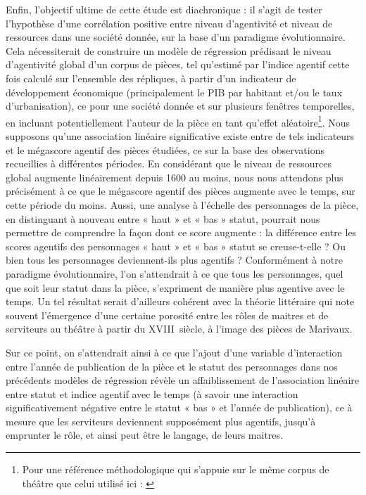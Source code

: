 Enfin, l’objectif ultime de cette étude est diachronique : il s’agit de tester l’hypothèse d’une corrélation positive entre niveau d’agentivité et niveau de ressources dans une société donnée, sur la base d’un paradigme évolutionnaire. Cela nécessiterait de construire un modèle de régression prédisant le niveau d’agentivité global d’un corpus de pièces, tel qu’estimé par l’indice agentif cette fois calculé sur l’ensemble des répliques, à partir d’un indicateur de développement économique (principalement le PIB par habitant et/ou le taux d'urbanisation), ce pour une société donnée et sur plusieurs fenêtres temporelles, en incluant potentiellement l’auteur de la pièce en tant qu’effet aléatoire\footnote{Pour une référence méthodologique qui s’appuie sur le même corpus de théâtre que celui utilisé ici : \cite{baumard_cultural_2022}}. Nous supposons qu’une association linéaire significative existe entre de tels indicateurs et le mégascore agentif des pièces étudiées, ce sur la base des observations recueillies à différentes périodes. En considérant que le niveau de ressources global augmente linéairement depuis 1600 au moins, nous nous attendons plus précisément à ce que le mégascore agentif des pièces augmente avec le temps, sur cette période du moins. Aussi, une analyse à l’échelle des personnages de la pièce, en distinguant à nouveau entre  « haut » et  « bas » statut, pourrait nous permettre de comprendre la façon dont ce score augmente : la différence entre les scores agentifs des personnages  « haut » et  « bas » statut se creuse-t-elle ? Ou bien tous les personnages deviennent-ils plus agentifs ? Conformément à notre paradigme évolutionnaire, l’on s’attendrait à ce que tous les personnages, quel que soit leur statut dans la pièce, s’expriment de manière plus agentive avec le temps. Un tel résultat serait d’ailleurs cohérent avec la théorie littéraire qui note souvent l’émergence d’une certaine porosité entre les rôles de maitres et de serviteurs au théâtre à partir du XVIII\ieme ~siècle, à l’image des pièces de Marivaux. 

Sur ce point, on s’attendrait ainsi à ce que l’ajout d’une variable d’interaction entre l’année de publication de la pièce et le statut des personnages dans nos précédents modèles de régression révèle un affaiblissement de l’association linéaire entre statut et indice agentif avec le temps (à savoir une interaction significativement négative entre le statut « bas » et l’année de publication), ce à mesure que les serviteurs deviennent supposément plus agentifs, jusqu’à emprunter le rôle, et ainsi peut être le langage, de leurs maitres. 


